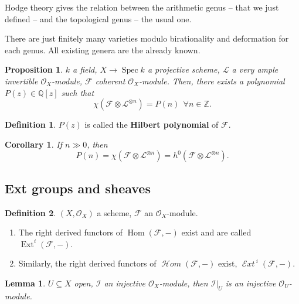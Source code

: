 \documentclass[12pt]{article}
\DeclareMathOperator{\Hom}{Hom}
\DeclareMathOperator{\Spec}{Spec}
\DeclareMathOperator{\shHom}{\mathcal H\textit{om}}
\DeclareMathOperator{\Ext}{Ext}
\DeclareMathOperator{\shExt}{\mathcal E\textit{xt}\,}
\newtheorem*{proposition}{Proposition}
\newtheorem*{lemma}{Lemma}
\newtheorem*{corollary}{Corollary}
\theoremstyle{definition}
\newtheorem*{definition}{Definition}
\begin{document}
Hodge theory gives the relation between the arithmetic genus -- that we just defined -- and the topological genus -- the usual one.

There are just finitely many varieties modulo birationality and deformation for each genus. All existing genera are the already known.

\begin{proposition}
$k$ a field, $X\rightarrow\Spec k$ a projective scheme, $\mathcal L$ a very ample invertible $\mathcal O_X$-module, $\mathcal F$ coherent $\mathcal O_X$-module. Then, there exists a polynomial $P(z)\in\mathbb Q[z]$ such that
\[\chi(\mathcal F\otimes\mathcal L^{\otimes n})=P(n)\ \ \forall n\in\mathbb Z.\]
\end{proposition}

\begin{definition}
$P(z)$ is called the \textbf{Hilbert polynomial} of $\mathcal F$.
\end{definition}

\begin{corollary}
If $n\gg0$, then
\[P(n)=\chi(\mathcal F\otimes\mathcal L^{\otimes n})=h^0(\mathcal F\otimes\mathcal L^{\otimes n}).\]
\end{corollary}

\subsection*{Ext groups and sheaves}
\begin{definition}
$(X,\mathcal O_X)$ a scheme, $\mathcal F$ an $\mathcal O_X$-module.

\begin{enumerate}[label=\arabic*)]
\item The right derived functors of $\Hom(\mathcal F,-)$ exist and are called $\Ext^i(\mathcal F,-)$.

\item Similarly, the right derived functors of $\shHom(\mathcal F,-)$ exist, $\shExt^i(\mathcal F,-)$.
\end{enumerate}
\end{definition}

\begin{lemma}
$U\subseteq X$ open, $\mathcal I$ an injective $\mathcal O_X$-module, then $\mathcal I|_U$ is an injective $\mathcal O_U$-module.
\end{lemma}
\end{document}
